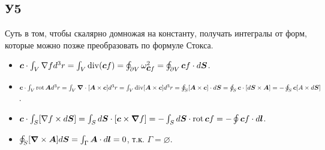 \subsection*{У5}
Суть в том, чтобы скалярно домножая на константу, получать интегралы от форм, которые можно позже преобразовать по формуле Стокса.
\begin{itemize}
	\item $\vc{c} \cdot \int_V \nabla f d^3 r = \int_V \div (\vc{c} f) = \oint_{\partial V} \omega_{\vc{c} f}^2 = \oint_{\partial V} \vc{c} f \cdot d \vc{S}$.

	\item $\vc{c} \cdot \int_V \rot \vc{A} d^3 r = \int_V \vc{\nabla} \cdot [\vc{A} \times \vc{c}] d^3 r = \int_V \div[\vc{A} \times \vc{c}] d^3 r =  \oint_S [\vc{A} \times \vc{c}] \cdot d\vc{S} = \oint_S \vc{c} \cdot [d \vc{S} \times \vc{A}] = - \oint_S \vc{c} [A \times d \vc{S}]$.

	\item $\vc{c} \cdot \int_S [\nabla f \times d \vc{S}] = \int_S d \vc{S} \cdot [\vc{c} \times \vc{\nabla} f] = - \int_S d \vc{S} \cdot \rot \vc{c} f = - \oint \vc{c} f \cdot d \vc{l}$.

	\item $\oint_S [\vc{\nabla} \times \vc{A}] d \vc{S} = \int_\Gamma \vc{A} \cdot d \vc{l} = 0$, т.к. $\Gamma = \varnothing$.
\end{itemize}